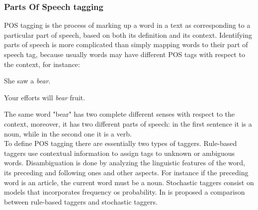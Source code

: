 \subsubsection{Parts Of Speech tagging}
\ac{POS} tagging is the process of marking up a word in a text as corresponding to a particular part of speech, based on both its definition and its context. Identifying parts of speech is more complicated than simply mapping words to their part of speech tag, because usually words may have different \ac{POS} tags with respect to the context, for instance:
\begin{description}
	\item She saw a \textit{bear}.
	\item Your efforts will \textit{bear} fruit.
\end{description}
The same word "bear" has two complete different senses with respect to the context, moreover, it has two different parts of speech: in the first sentence it is a noun, while in the second one it is a verb.\\
To define \ac{POS} tagging there are essentially two types of taggers. Rule-based taggers use contextual information to assign tags to unknown or ambiguous words. Disambiguation is done by analyzing the linguistic features of the word, its preceding and following ones and other aspects. For instance if the preceding word is an article, the current word must be a noun. Stochastic taggers consist on models that incorporates frequency os probability. In \cite{articlepos} is proposed a comparison between rule-based taggers and stochastic taggers.


